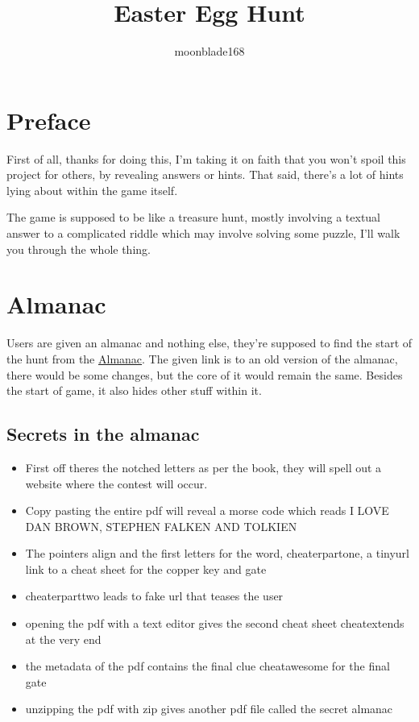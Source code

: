 \documentclass[12pt]{article}
\title{Easter Egg Hunt}
\author{moonblade168}
\begin{document}
\maketitle

\section{Preface}
First of all, thanks for doing this, I'm taking it on faith that you won't spoil this project for others, by revealing answers or hints. That said, there's a lot of hints lying about within the game itself. 

The game is supposed to be like a treasure hunt, mostly involving a textual answer to a complicated riddle which may involve solving some puzzle, I'll walk you through the whole thing.

\section{Almanac}
Users are given an almanac and nothing else, they're supposed to find the start of the hunt from the \href{https://drive.google.com/file/d/0Bw1NE28SnI6_QWNuOEt2SExWUUk/view?usp=sharing}{Almanac}. The given link is to an old version of the almanac, there would be some changes, but the core of it would remain the same. Besides the start of game, it also hides other stuff within it.

\subsection{Secrets in the almanac}
\begin{itemize}
\item First off theres the notched letters as per the book, they will spell out a website where the contest will occur.
\item Copy pasting the entire pdf will reveal a morse code which reads I LOVE DAN BROWN, STEPHEN FALKEN AND TOLKIEN
\item The pointers align and the first letters for the word, cheaterpartone, a tinyurl link to a cheat sheet for the copper key and gate
\item cheaterparttwo leads to fake url that teases the user
\item opening the pdf with a text editor gives the second cheat sheet cheatextends at the very end
\item the metadata of the pdf contains the final clue cheatawesome for the final gate
\item unzipping the pdf with zip gives another pdf file called the secret almanac
\end{itemize}
\end{document}
